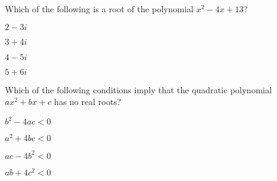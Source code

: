 \documentclass{article}
\begin{document}
\begin{readinessAssuranceTest}
\item Which of the following is a root of the polynomial $x^2-4x+13$?
\begin{multicols}{4}
\begin{readinessAssuranceTestChoices}
\item $2-3i$ %
\item $3+4i$
\item $4-5i$
\item $5+6i$
\end{readinessAssuranceTestChoices}
\end{multicols}

\item Which of the following conditions imply that the quadratic polynomial $ax^2+bx+c$ has no real roots?
\begin{multicols}{2}
\begin{readinessAssuranceTestChoices}
\item $b^2-4ac<0$ %
\item $a^2+4bc<0$
\item $ac-4b^2<0$
\item $ab+4c^2<0$
\end{readinessAssuranceTestChoices}
\end{multicols}

\end{readinessAssuranceTest}
\end{document}
